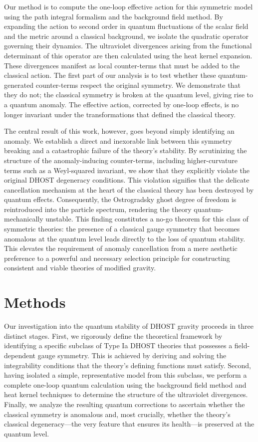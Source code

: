 \documentclass[twocolumn]{aastex631}
\begin{document}
Our method is to compute the one-loop effective action for this symmetric model using the path integral formalism and the background field method. By expanding the action to second order in quantum fluctuations of the scalar field and the metric around a classical background, we isolate the quadratic operator governing their dynamics. The ultraviolet divergences arising from the functional determinant of this operator are then calculated using the heat kernel expansion. These divergences manifest as local counter-terms that must be added to the classical action. The first part of our analysis is to test whether these quantum-generated counter-terms respect the original symmetry. We demonstrate that they do not; the classical symmetry is broken at the quantum level, giving rise to a quantum anomaly. The effective action, corrected by one-loop effects, is no longer invariant under the transformations that defined the classical theory.

The central result of this work, however, goes beyond simply identifying an anomaly. We establish a direct and inexorable link between this symmetry breaking and a catastrophic failure of the theory's stability. By scrutinizing the structure of the anomaly-inducing counter-terms, including higher-curvature terms such as a Weyl-squared invariant, we show that they explicitly violate the original DHOST degeneracy conditions. This violation signifies that the delicate cancellation mechanism at the heart of the classical theory has been destroyed by quantum effects. Consequently, the Ostrogradsky ghost degree of freedom is reintroduced into the particle spectrum, rendering the theory quantum-mechanically unstable. This finding constitutes a no-go theorem for this class of symmetric theories: the presence of a classical gauge symmetry that becomes anomalous at the quantum level leads directly to the loss of quantum stability. This elevates the requirement of anomaly cancellation from a mere aesthetic preference to a powerful and necessary selection principle for constructing consistent and viable theories of modified gravity.


\section{Methods}
\label{sec:methods}
Our investigation into the quantum stability of DHOST gravity proceeds in three distinct stages. First, we rigorously define the theoretical framework by identifying a specific subclass of Type Ia DHOST theories that possesses a field-dependent gauge symmetry. This is achieved by deriving and solving the integrability conditions that the theory's defining functions must satisfy. Second, having isolated a simple, representative model from this subclass, we perform a complete one-loop quantum calculation using the background field method and heat kernel techniques to determine the structure of the ultraviolet divergences. Finally, we analyze the resulting quantum corrections to ascertain whether the classical symmetry is anomalous and, most crucially, whether the theory's classical degeneracy---the very feature that ensures its health---is preserved at the quantum level.
\end{document}
